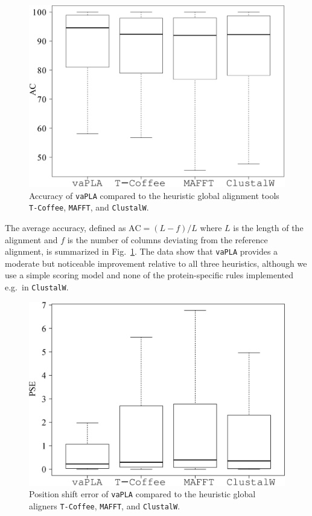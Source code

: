 \documentclass[a4paper,10pt]{article}
\newcommand{\TODO}[1]{\begingroup\color{red}#1\endgroup}
\newcommand{\SAFTWARE}{\texttt{vaPLA}} %
\begin{document}
\begin{figure}
  \begin{center}
    \includegraphics[width=1\columnwidth]{ac.eps}
  \end{center}
  \caption{Accuracy of \SAFTWARE{} compared to the heuristic global
    alignment tools \texttt{T-Coffee}, \texttt{MAFFT}, and
    \texttt{ClustalW}.}
    \label{fig:ac}
\end{figure}

The average accuracy, defined as $\mbox{AC}=(L-f)/L$ where $L$ is the
length of the alignment and $f$ is the number of columns deviating from the
reference alignment, is summarized in Fig.~\ref{fig:ac}. The data show that
\SAFTWARE{} provides a moderate but noticeable improvement relative to all
three heuristics, although we use a simple scoring model and none of the
protein-specific rules implemented e.g.\ in \texttt{ClustalW}.

\begin{figure}
  \begin{center}
    \includegraphics[width=1\columnwidth]{pse.eps}
  \end{center}
  \caption{Position shift error of \SAFTWARE{} compared to the heuristic
    global aligners \texttt{T-Coffee}, \texttt{MAFFT}, and
    \texttt{ClustalW}.}
  \label{fig:pse}
\end{figure}
\end{document}
